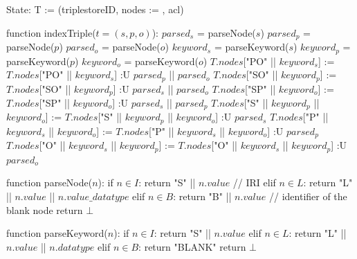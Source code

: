 State:
    T := (triplestoreID, nodes := {}, acl)

function indexTriple($t = (s, p, o)$):
    $parsed_s$ = parseNode($s$)
    $parsed_p$ = parseNode($p$)
    $parsed_o$ = parseNode($o$)
    $keyword_s$ = parseKeyword($s$)
    $keyword_p$ = parseKeyword($p$)
    $keyword_o$ = parseKeyword($o$)
    $T.nodes$["PO" || $keyword_s$] := $T.nodes$["PO" || $keyword_s$] :U {$parsed_p$ || $parsed_o$}
    $T.nodes$["SO" || $keyword_p$] := $T.nodes$["SO" || $keyword_p$] :U {$parsed_s$ || $parsed_o$}
    $T.nodes$["SP" || $keyword_o$] := $T.nodes$["SP" || $keyword_o$] :U {$parsed_s$ || $parsed_p$}
    $T.nodes$["S" || $keyword_p$ || $keyword_o$] := $T.nodes$["S" || $keyword_p$ || $keyword_o$] :U {$parsed_s$}
    $T.nodes$["P" || $keyword_s$ || $keyword_o$] := $T.nodes$["P" || $keyword_s$ || $keyword_o$] :U {$parsed_p$}
    $T.nodes$["O" || $keyword_s$ || $keyword_p$] := $T.nodes$["O" || $keyword_s$ || $keyword_p$] :U {$parsed_o$}

function parseNode($n$):
    if $n \in I$:            
        return "S" || $n.value$  // IRI
    elif $n \in L$:
        return "L" || $n.value$ || $n.value\_datatype$
    elif $n \in B$:
        return "B" || $n.value$    // identifier of the blank node
    return $\bot$

function parseKeyword($n$):
    if $n \in I$:            
        return "S" || $n.value$   
    elif $n \in L$:
        return "L" || $n.value$ || $n.datatype$
    elif $n \in B$:
        return "BLANK"
    return $\bot$
